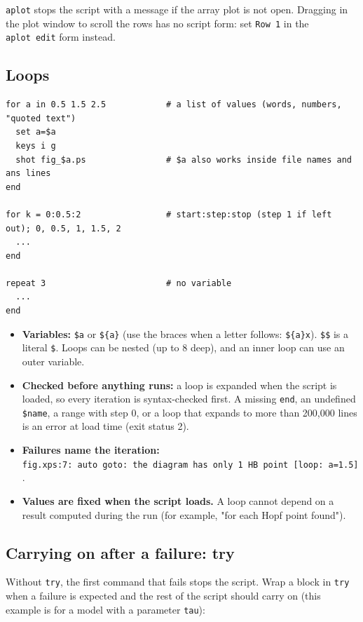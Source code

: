 \documentclass{article}
\providecommand{\tightlist}{\setlength{\itemsep}{0pt}\setlength{\parskip}{0pt}}
\begin{document}
\texttt{aplot} stops the script with a message if the array plot
is not open. Dragging in the plot window to scroll the rows has no script
form: set \texttt{Row\ 1} in the \texttt{aplot\ edit} form
instead.

\subsection{Loops}\label{scr:9}

{\small\begin{verbatim}
for a in 0.5 1.5 2.5            # a list of values (words, numbers, "quoted text")
  set a=$a
  keys i g
  shot fig_$a.ps                # $a also works inside file names and ans lines
end

for k = 0:0.5:2                 # start:step:stop (step 1 if left out); 0, 0.5, 1, 1.5, 2
  ...
end

repeat 3                        # no variable
  ...
end
\end{verbatim}}

\begin{itemize}
\tightlist
\item
  \textbf{Variables:} \texttt{\$a} or \texttt{\$\{a\}}
  (use the braces when a letter follows: \texttt{\$\{a\}x}).
  \texttt{\$\$} is a literal \texttt{\$}. Loops can be nested (up to
  8 deep), and an inner loop can use an outer variable.
\item
  \textbf{Checked before anything runs:} a loop is expanded
  when the script is loaded, so every iteration is syntax-checked first. A
  missing \texttt{end}, an undefined \texttt{\$name}, a range with
  step 0, or a loop that expands to more than 200,000 lines is an error at
  load time (exit status 2).
\item
  \textbf{Failures name the iteration:}
  \texttt{fig.xps:7:\ auto\ goto:\ the\ diagram\ has\ only\ 1\ HB\ point\ {[}loop:\ a=1.5{]}}.
\item
  \textbf{Values are fixed when the script loads.} A loop
  cannot depend on a result computed during the run (for example, "for
  each Hopf point found").
\end{itemize}

\subsection{Carrying on after a failure: try}\label{scr:10}

Without \texttt{try}, the first command that fails stops the
script. Wrap a block in \texttt{try} when a failure is expected and
the rest of the script should carry on (this example is for a model with
a parameter \texttt{tau}):
\end{document}
